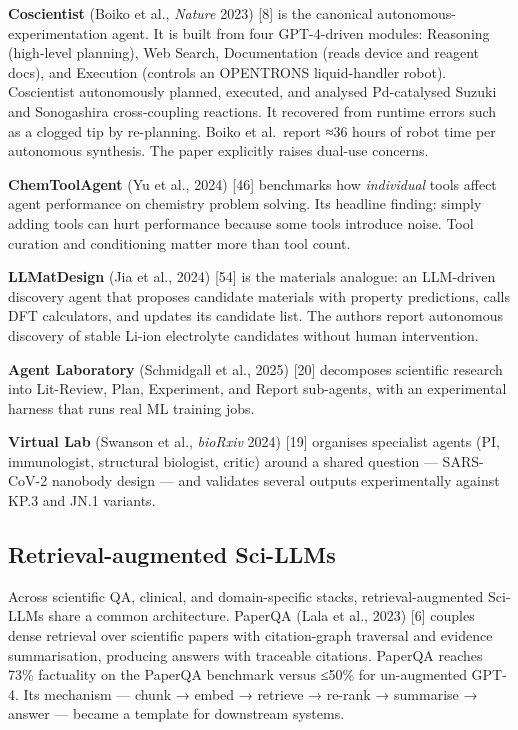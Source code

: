 \textbf{Coscientist} (Boiko et al., \emph{Nature} 2023) {[}8{]} is the canonical autonomous-experimentation agent. It is built from four GPT-4-driven modules: Reasoning (high-level planning), Web Search, Documentation (reads device and reagent docs), and Execution (controls an OPENTRONS liquid-handler robot). Coscientist autonomously planned, executed, and analysed Pd-catalysed Suzuki and Sonogashira cross-coupling reactions. It recovered from runtime errors such as a clogged tip by re-planning. Boiko et al.~report ≈36 hours of robot time per autonomous synthesis. The paper explicitly raises dual-use concerns.

\textbf{ChemToolAgent} (Yu et al., 2024) {[}46{]} benchmarks how \emph{individual} tools affect agent performance on chemistry problem solving. Its headline finding: simply adding tools can hurt performance because some tools introduce noise. Tool curation and conditioning matter more than tool count.

\textbf{LLMatDesign} (Jia et al., 2024) {[}54{]} is the materials analogue: an LLM-driven discovery agent that proposes candidate materials with property predictions, calls DFT calculators, and updates its candidate list. The authors report autonomous discovery of stable Li-ion electrolyte candidates without human intervention.

\textbf{Agent Laboratory} (Schmidgall et al., 2025) {[}20{]} decomposes scientific research into Lit-Review, Plan, Experiment, and Report sub-agents, with an experimental harness that runs real ML training jobs.

\textbf{Virtual Lab} (Swanson et al., \emph{bioRxiv} 2024) {[}19{]} organises specialist agents (PI, immunologist, structural biologist, critic) around a shared question --- SARS-CoV-2 nanobody design --- and validates several outputs experimentally against KP.3 and JN.1 variants.

\subsection{Retrieval-augmented Sci-LLMs}\label{retrieval-augmented-sci-llms}

Across scientific QA, clinical, and domain-specific stacks, retrieval-augmented Sci-LLMs share a common architecture. PaperQA (L\textquotesingle ala et al., 2023) {[}6{]} couples dense retrieval over scientific papers with citation-graph traversal and evidence summarisation, producing answers with traceable citations. PaperQA reaches 73\% factuality on the PaperQA benchmark versus ≤50\% for un-augmented GPT-4. Its mechanism --- chunk → embed → retrieve → re-rank → summarise → answer --- became a template for downstream systems.

